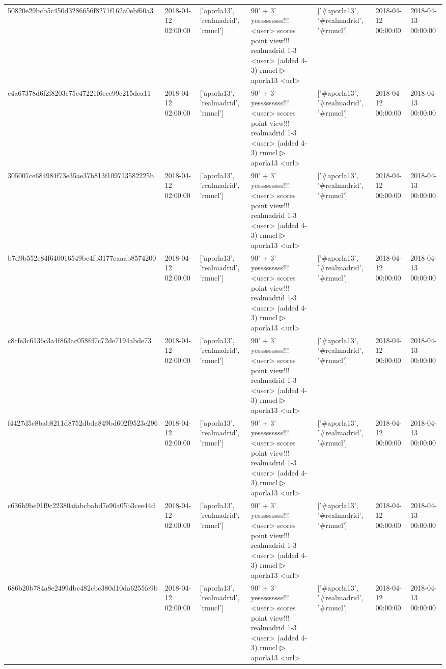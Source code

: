 \begin{tabular}{lllllll}
50820e29bcb5c450d3286656f8271f162a0ebf60a3 & 2018-04-12 02:00:00 & ['aporla13', 'realmadrid', 'rmucl'] & 90' + 3' yesssssssss!!! <user> scores point view!!! realmadrid 1-3 <user> (added 4-3) rmucl ▷ aporla13 <url> & ['#aporla13', '#realmadrid', '#rmucl'] & 2018-04-12 00:00:00 & 2018-04-13 00:00:00 \\
c4a67378d6f2f8203c75e47221f6ece99c215dea11 & 2018-04-12 02:00:00 & ['aporla13', 'realmadrid', 'rmucl'] & 90' + 3' yesssssssss!!! <user> scores point view!!! realmadrid 1-3 <user> (added 4-3) rmucl ▷ aporla13 <url> & ['#aporla13', '#realmadrid', '#rmucl'] & 2018-04-12 00:00:00 & 2018-04-13 00:00:00 \\
305007ce684984f73e35ae37b813f109713582225b & 2018-04-12 02:00:00 & ['aporla13', 'realmadrid', 'rmucl'] & 90' + 3' yesssssssss!!! <user> scores point view!!! realmadrid 1-3 <user> (added 4-3) rmucl ▷ aporla13 <url> & ['#aporla13', '#realmadrid', '#rmucl'] & 2018-04-12 00:00:00 & 2018-04-13 00:00:00 \\
b7d9b552e84f640016549be4fb3177eaaab8574200 & 2018-04-12 02:00:00 & ['aporla13', 'realmadrid', 'rmucl'] & 90' + 3' yesssssssss!!! <user> scores point view!!! realmadrid 1-3 <user> (added 4-3) rmucl ▷ aporla13 <url> & ['#aporla13', '#realmadrid', '#rmucl'] & 2018-04-12 00:00:00 & 2018-04-13 00:00:00 \\
c8cfe3c6136c3a4f863ac058fd7c72de7194abde73 & 2018-04-12 02:00:00 & ['aporla13', 'realmadrid', 'rmucl'] & 90' + 3' yesssssssss!!! <user> scores point view!!! realmadrid 1-3 <user> (added 4-3) rmucl ▷ aporla13 <url> & ['#aporla13', '#realmadrid', '#rmucl'] & 2018-04-12 00:00:00 & 2018-04-13 00:00:00 \\
f4427d5c8bab8211d8752dbda849bd602f9523c296 & 2018-04-12 02:00:00 & ['aporla13', 'realmadrid', 'rmucl'] & 90' + 3' yesssssssss!!! <user> scores point view!!! realmadrid 1-3 <user> (added 4-3) rmucl ▷ aporla13 <url> & ['#aporla13', '#realmadrid', '#rmucl'] & 2018-04-12 00:00:00 & 2018-04-13 00:00:00 \\
c636b9be91f9c22380afabcbabd7e90a05b3cee44d & 2018-04-12 02:00:00 & ['aporla13', 'realmadrid', 'rmucl'] & 90' + 3' yesssssssss!!! <user> scores point view!!! realmadrid 1-3 <user> (added 4-3) rmucl ▷ aporla13 <url> & ['#aporla13', '#realmadrid', '#rmucl'] & 2018-04-12 00:00:00 & 2018-04-13 00:00:00 \\
686b20b784a8e2499dbc482cbc380d10da6255fc9b & 2018-04-12 02:00:00 & ['aporla13', 'realmadrid', 'rmucl'] & 90' + 3' yesssssssss!!! <user> scores point view!!! realmadrid 1-3 <user> (added 4-3) rmucl ▷ aporla13 <url> & ['#aporla13', '#realmadrid', '#rmucl'] & 2018-04-12 00:00:00 & 2018-04-13 00:00:00 \\

\end{tabular}
